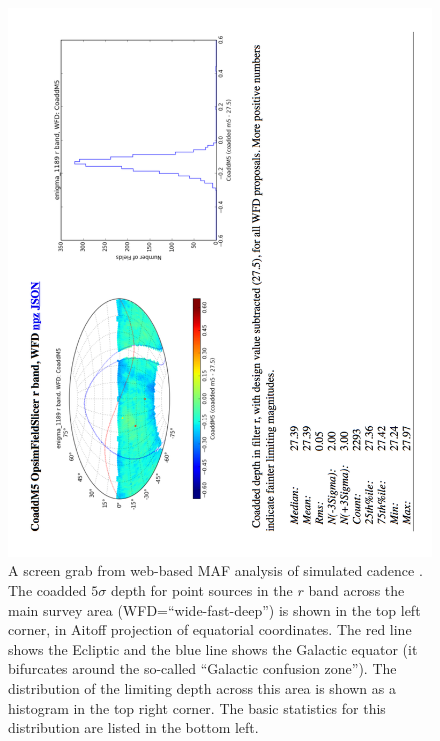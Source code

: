 \begin{figure}[t!]
\vskip -0.1in
\includegraphics[angle=270,width=0.99\hsize:,clip]{figs/enigma1189_DWFcoaddr5.pdf}
\caption{A screen grab from web-based MAF analysis of simulated cadence
. The coadded $5\sigma$ depth for point sources in the $r$ band
across the main survey area (WFD=``wide-fast-deep'') is shown in the top left corner,
in Aitoff projection of equatorial coordinates. The red line shows the Ecliptic and
the blue line shows the Galactic equator (it bifurcates around the so-called
``Galactic confusion zone'').  The distribution of the limiting depth across this
area is shown as a histogram in the top right corner. The basic statistics for
this distribution are listed in the bottom left.}
\label{fig:coaddm5enigma}
\end{figure}

